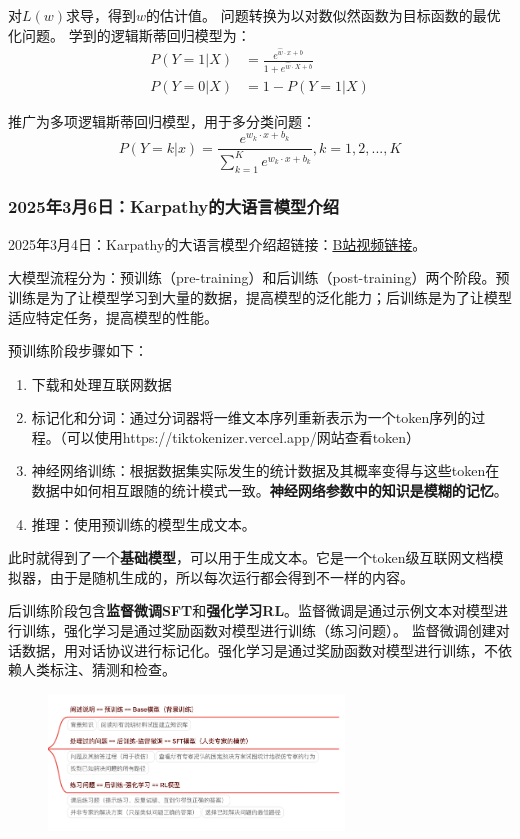 \documentclass[12pt]{article}
\begin{document}
对$L(w)$求导，得到$w$的估计值。
问题转换为以对数似然函数为目标函数的最优化问题。
学到的逻辑斯蒂回归模型为：
\begin{align*}
    P(Y=1|X) &= \frac{ e^{\hat{w} \cdot x + b} }{1 + e^{\hat{w} \cdot X + b}} \\
    P(Y=0|X) &= 1 - P(Y=1|X)
\end{align*}

推广为多项逻辑斯蒂回归模型，用于多分类问题：
$$
P(Y=k|x) = \frac {e^{w_k \cdot x + b_k}}{\sum_{k=1}^{K} e^{w_k \cdot x + b_k}} , k = 1,2,...,K
$$

\subsubsection{2025年3月6日：Karpathy的大语言模型介绍}
2025年3月4日：Karpathy的大语言模型介绍超链接：\href{https://www.bilibili.com/video/BV16cNEeXEer/?spm_id_from=333.337.search-card.all.click&vd_source=13dfbe5ed2deada83969fafa995ccff6}{B站视频链接}。

大模型流程分为：预训练（pre-training）和后训练（post-training）两个阶段。预训练是为了让模型学习到大量的数据，提高模型的泛化能力；后训练是为了让模型适应特定任务，提高模型的性能。

预训练阶段步骤如下：
\begin{enumerate}
    \item 下载和处理互联网数据
    \item 标记化和分词：通过分词器将一维文本序列重新表示为一个token序列的过程。（可以使用https://tiktokenizer.vercel.app/网站查看token）
    \item 神经网络训练：根据数据集实际发生的统计数据及其概率变得与这些token在数据中如何相互跟随的统计模式一致。\textbf{神经网络参数中的知识是模糊的记忆}。
    \item 推理：使用预训练的模型生成文本。
\end{enumerate}
此时就得到了一个\textbf{基础模型}，可以用于生成文本。它是一个token级互联网文档模拟器，由于是随机生成的，所以每次运行都会得到不一样的内容。

后训练阶段包含\textbf{监督微调SFT}和\textbf{强化学习RL}。监督微调是通过示例文本对模型进行训练，强化学习是通过奖励函数对模型进行训练（练习问题）。
监督微调创建对话数据，用对话协议进行标记化。强化学习是通过奖励函数对模型进行训练，不依赖人类标注、猜测和检查。

\begin{figure}[h]
    \centering
    \includegraphics[width=0.7\textwidth]{./images/karpathyllm.png}
\end{figure}
\end{document}
